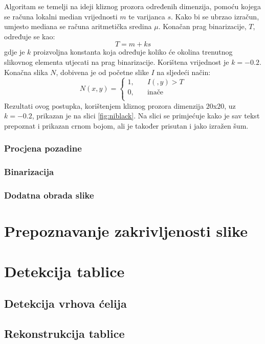 \documentclass[times, utf8, zavrsni, numeric]{fer}
\begin{document}
Algoritam se temelji na ideji kliznog prozora određenih dimenzija, pomoću kojega se računa lokalni median vrijednosti $m$ te varijanca $s$. 
Kako bi se ubrzao izračun, umjesto mediana se računa aritmetička sredina $\mu$.
Konačan prag binarizacije, $T$, određuje se kao:
\[ T = m + ks \]
gdje je $k$ proizvoljna konstanta koja određuje koliko će okolina trenutnog slikovnog elementa utjecati na prag binarizacije.
Korištena vrijednost je $k = -0.2$.
Konačna slika $N$, dobivena je od početne slike $I$ na sljedeći način:
\[
    N(x, y) =
    \begin{cases}
        1,   & \quad I(, y) > T\\
        0,  & \quad \text{inače}\\
    \end{cases}
\]
Rezultati ovog postupka, korištenjem kliznog prozora dimenzija $20$x$20$, uz $k=-0.2$, prikazan je na slici \ref{fig:niblack}.
Na slici se primjećuje kako je sav tekst prepoznat i prikazan crnom bojom, ali je također prisutan i jako izražen šum.

\subsection{Procjena pozadine}


\subsection{Binarizacija}
\subsection{Dodatna obrada slike}


\chapter{Prepoznavanje zakrivljenosti slike}

\chapter{Detekcija tablice}
\section{Detekcija vrhova ćelija}
\section{Rekonstrukcija tablice}
\end{document}
